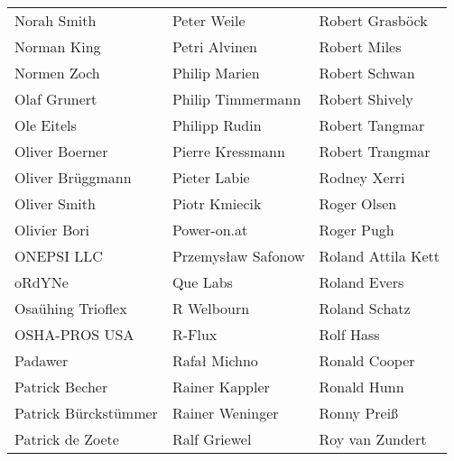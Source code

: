 \begin{tabular}{p{4.5cm}p{4.5cm}p{4.5cm}}
Norah Smith & Peter Weile & Robert Grasböck \\
Norman King & Petri Alvinen & Robert Miles \\
Normen Zoch & Philip Marien & Robert Schwan \\
Olaf Grunert & Philip Timmermann & Robert Shively \\
Ole Eitels & Philipp Rudin & Robert Tangmar \\
Oliver Boerner & Pierre Kressmann & Robert Trangmar \\
Oliver Brüggmann & Pieter Labie & Rodney Xerri \\
Oliver Smith & Piotr Kmiecik & Roger Olsen \\
Olivier Bori & Power-on.at & Roger Pugh \\
ONEPSI LLC & Przemysław Safonow & Roland Attila Kett \\
oRdYNe & Que Labs & Roland Evers \\
Osaühing Trioflex & R Welbourn & Roland Schatz \\
OSHA-PROS USA & R-Flux & Rolf Hass \\
Padawer & Rafał Michno & Ronald Cooper \\
Patrick Becher & Rainer Kappler & Ronald Hunn \\
Patrick Bürckstümmer & Rainer Weninger & Ronny Preiß \\
Patrick de Zoete & Ralf Griewel & Roy van Zundert \\
\end{tabular}
\newpage
\setlength{\tabcolsep}{1mm}
